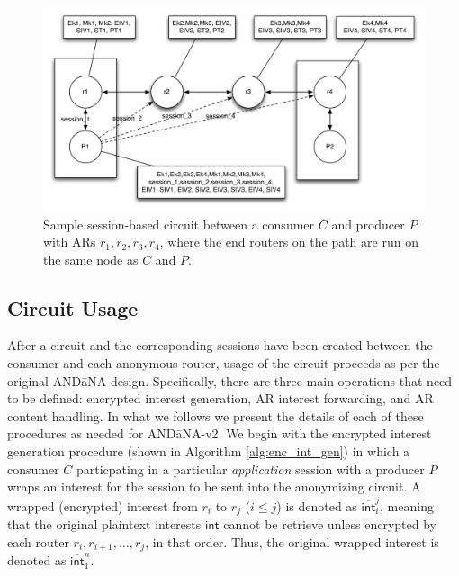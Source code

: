\documentclass[10pt]{article}
\begin{document}
\begin{figure}[ht!]
\begin{center}
\includegraphics[scale=0.5]{./images/circuit.pdf}
\end{center}
\caption{Sample session-based circuit between a consumer $C$ and producer $P$ with ARs $r_1,r_2,r_3,r_4$, where the end routers on the path are run on the same node as $C$ and $P$.}
\label{fig:circuit}
\end{figure}

\subsection{Circuit Usage}

After a circuit and the corresponding sessions have been created between the consumer and each anonymous router, usage of the circuit proceeds as per the original {\sf AND\=aNA} design. Specifically, there are three main operations that need to be defined: encrypted interest generation, AR interest forwarding, and AR content handling. In what we follows we present the details of each of these procedures as needed for {\sf AND\=aNA-v2}. We begin with the encrypted interest generation procedure (shown in Algorithm \ref{alg:enc_int_gen}) in which a consumer $C$ particpating in a particular \emph{application} session with a producer $P$ wraps an interest for the session to be sent into the anonymizing circuit. A wrapped (encrypted) interest from $r_i$ to $r_j$ ($i \leq j$) is denoted as $\overline{\mathsf{int}}_i^j$, meaning that the original plaintext interests $\mathsf{int}$ cannot be retrieve unless encrypted by each router $r_i,r_{i+1},\dots,r_j$, in that order. Thus, the original wrapped interest is denoted as $\overline{\mathsf{int}}_1^n$.
\end{document}
